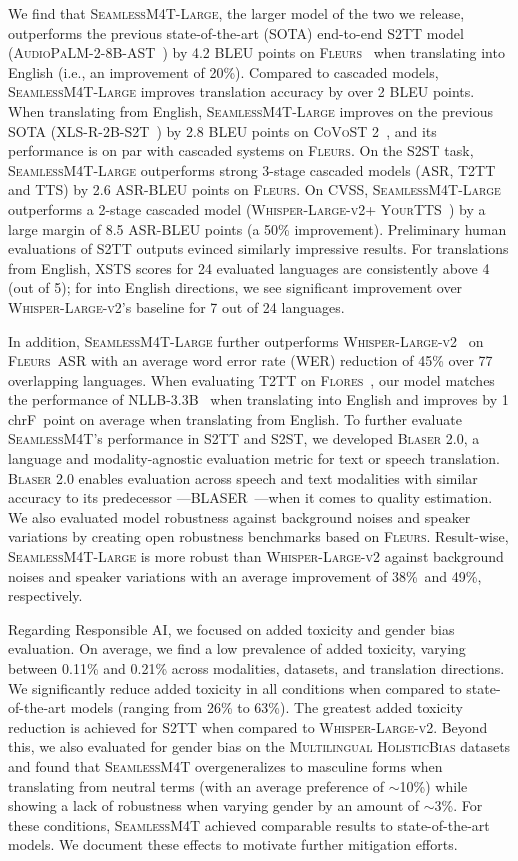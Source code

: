 \documentclass[twoside,11pt]{article}
\newcommand{\mfourt}{\textsc{SeamlessM4T}\xspace}
\newcommand{\mfourtlg}{\textsc{SeamlessM4T-Large}\xspace}
\newcommand{\mt}{{T2TT}\xspace}
\newcommand{\asr}{{ASR}\xspace}
\newcommand{\st}{{S2TT}\xspace}
\newcommand{\sst}{{S2ST}\xspace}
\newcommand{\chrf}{chrF\nolinebreak\hspace{-.05em}\raisebox{.4ex}{\tiny\bf +}\nolinebreak\hspace{-.10em}\raisebox{.4ex}{\tiny\bf +}}
\newcommand{\bleu}{\textsc{BLEU}\xspace}
\newcommand{\wer}{\textsc{WER}\xspace}
\newcommand{\blaser}{\textsc{Blaser 2.0}\xspace}
\newcommand{\asrbleu}{\textsc{ASR-BLEU}\xspace}
\newcommand{\multilingualholisticbias}{\textsc{Multilingual HolisticBias}\xspace}
\newcommand{\flores}{\textsc{Flores}\xspace}
\newcommand{\fleurs}{\textsc{Fleurs}\xspace}
\newcommand{\covost}{\textsc{CoVoST} 2\xspace}
\newcommand{\cvss}{\textsc{CVSS}\xspace}
\newcommand{\whisperlarge}{\textsc{Whisper-Large-v2}\xspace}
\newcommand{\noiserobustnessgain}{38\%}
\newcommand{\speakerrobustnessgain}{49\%}
\newcommand{\audiopalmast}{\textsc{AudioPaLM-2-8B-AST}}
\newcommand{\xlsrstot}{\textsc{XLS-R-2B-S2T}}
\newcommand{\yourtts}{\textsc{YourTTS}}
\begin{document}
We find that \mfourtlg, the larger model of the two we release, outperforms the previous state-of-the-art (SOTA) end-to-end \st model (\audiopalmast~\citep{Rubenstein2023AudioPaLMAL}) by 4.2 \bleu points on \fleurs~\citep{fleurs2022arxiv} when translating into English (i.e., an improvement of 20\%). Compared to cascaded models, \mfourtlg improves translation accuracy by over 2 \bleu points.
When translating from English, \mfourtlg improves on the previous SOTA (\xlsrstot~\citep{babu2021xls}) by 2.8 \bleu points on \covost~\citep{wang2021covost}, and its performance is on par with cascaded systems on \fleurs.
On the \sst task, \mfourtlg outperforms strong 3-stage cascaded models (\asr, \mt and TTS) by 2.6 \asrbleu points on \fleurs. On \cvss, \mfourtlg outperforms a 2-stage cascaded model (\whisperlarge + \yourtts~\citep{casanova2022yourtts}) by a large margin of 8.5 \asrbleu points (a 50\% improvement).
Preliminary human evaluations of \st outputs evinced similarly impressive results. For translations from English, XSTS scores for 24 evaluated languages are consistently above 4 (out of 5); for into English directions, we see significant improvement over \whisperlarge's baseline for 7 out of 24 languages. 

In addition, \mfourtlg further outperforms \whisperlarge~\citep{whisper} on \fleurs~\asr with an average word error rate (\wer) reduction of 45\% over 77 overlapping languages. When evaluating \mt on \flores~\citep{flores101:2021}, our model matches the performance of NLLB-3.3B~\citep{nllb2022} when translating into English and improves by 1 \chrf~point on average when translating from English.
To further evaluate \mfourt's performance in \st and \sst, we developed \blaser, a language and modality-agnostic evaluation metric for text or speech translation. \blaser 
enables evaluation across speech and text modalities with similar accuracy to its predecessor —BLASER~\citep{chen-etal-2023-blaser}—when it comes to quality estimation.
We also evaluated model robustness against background noises and speaker variations by creating open robustness benchmarks based on \fleurs. 
Result-wise, \mfourtlg is more robust than \whisperlarge against background noises and speaker variations with an average improvement of \noiserobustnessgain~and \speakerrobustnessgain, respectively.

Regarding Responsible AI, we focused on added toxicity and gender bias evaluation. On average, we find a low prevalence of added toxicity, varying between 0.11\% and 0.21\% across modalities, datasets, and translation directions. We significantly reduce added toxicity in all conditions when compared to state-of-the-art models (ranging from 26\% to 63\%). The greatest added toxicity reduction is achieved for \st{} when compared to \whisperlarge. Beyond this, we also evaluated for gender bias on the \multilingualholisticbias datasets and found that \mfourt overgeneralizes to masculine forms when translating from neutral terms (with an average preference of $\sim$10\%) while showing a lack of robustness when varying gender by an amount of $\sim$3\%. For these conditions, \mfourt achieved comparable results to state-of-the-art models. 
We document these effects to motivate further mitigation efforts.
\end{document}
